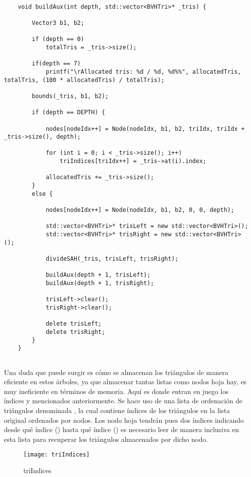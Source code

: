 \begin{lstlisting}
	
	void buildAux(int depth, std::vector<BVHTri>* _tris) {

		Vector3 b1, b2;

		if (depth == 0)
			totalTris = _tris->size();

		if(depth == 7)
			printf("\rAllocated tris: %d / %d, %d%%", allocatedTris, totalTris, (100 * allocatedTris) / totalTris);

		bounds(_tris, b1, b2);

		if (depth == DEPTH) {

			nodes[nodeIdx++] = Node(nodeIdx, b1, b2, triIdx, triIdx + _tris->size(), depth);

			for (int i = 0; i < _tris->size(); i++)
				triIndices[triIdx++] = _tris->at(i).index;

			allocatedTris += _tris->size();
		}
		else {

			nodes[nodeIdx++] = Node(nodeIdx, b1, b2, 0, 0, depth);

			std::vector<BVHTri>* trisLeft = new std::vector<BVHTri>();
			std::vector<BVHTri>* trisRight = new std::vector<BVHTri>();

			divideSAH(_tris, trisLeft, trisRight);

			buildAux(depth + 1, trisLeft);
			buildAux(depth + 1, trisRight);

			trisLeft->clear();
			trisRight->clear();

			delete trisLeft;
			delete trisRight;
		}
	}
	
\end{lstlisting}

Una duda que puede surgir es cómo se almacenan los triángulos de manera eficiente en estos árboles, ya que almacenar tantas listas como nodos hoja hay, es muy ineficiente en términos de memoria. Aquí es donde entran en juego los índices  y  mencionados anteriormente. Se hace uso de una lista de ordenación de triángulos denominada , la cual contiene índices de los triángulos en la lista original ordenados por nodos. Los nodo hoja tendrán pues dos índices indicando desde qué índice () hasta qué índice () es necesario leer de manera inclusiva en esta lista para recuperar los triángulos almacenados por dicho nodo.

\begin{figure}[H]
    \centering
	\texttt{[image: triIndices]}
	\caption{triIndices}
	\label{fig:label}
\end{figure}

